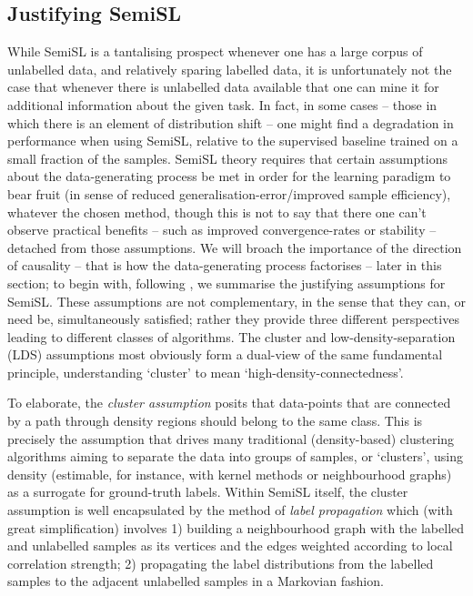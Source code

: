 \subsection{Justifying \acs{SemiSL}}\label{ssec:assumptions}
While \ac{SemiSL} is a tantalising prospect whenever one has a large corpus of unlabelled data, and
relatively sparing labelled data, it is unfortunately not the case that whenever there is
unlabelled data available that one can mine it for additional information about the given task. 
%
In fact, in some cases -- those in which there is an element of distribution shift -- one might
find a degradation in performance when using \ac{SemiSL}, relative to the supervised baseline trained on
a small fraction of the samples.
%
\ac{SemiSL} theory requires that certain assumptions about the data-generating process be met in order
for the learning paradigm to bear fruit (in sense of reduced generalisation-error/improved sample
efficiency), whatever the chosen method, though this is not to say that there one can't observe
practical benefits -- such as improved convergence-rates or stability -- detached from those
assumptions.
%
We will broach the importance of the direction of causality -- that is how the data-generating
process factorises -- later in this section; to begin with, following \citep{chapelle2009semi}, we
summarise the justifying assumptions for \ac{SemiSL}.
%
These assumptions are not complementary, in the sense that they can, or need be, simultaneously
satisfied; rather they provide three different perspectives leading to different classes of
algorithms. 
%
The cluster and low-density-separation (LDS) assumptions most obviously form a dual-view of the same
fundamental principle, understanding `cluster' to mean `high-density-connectedness'.
%


%
To elaborate, the \emph{cluster assumption} posits that data-points that are connected by a path
through density regions should belong to the same class.
%
This is precisely the assumption that drives many traditional (density-based) clustering algorithms
aiming to separate the data into groups of samples, or `clusters', using density (estimable, for
instance, with kernel methods or neighbourhood graphs) as a surrogate for ground-truth labels.
%
Within \ac{SemiSL} itself, the cluster assumption is well encapsulated by the method of \emph{label
propagation} \citep{szummer2001partially} which (with great simplification) involves 1) building a
neighbourhood graph with the labelled and unlabelled samples as its vertices and the edges weighted
according to local correlation strength; 2) propagating the label distributions from the labelled
samples to the adjacent unlabelled samples in a Markovian fashion.
%

